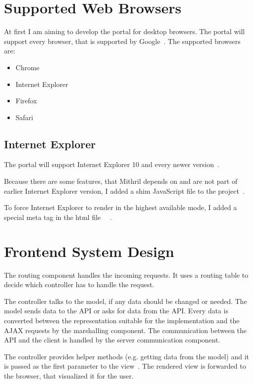 \section{Supported Web Browsers}
At first I am aiming to develop the portal for desktop browsers. The portal will support every browser, that is supported by Google~\cite{google-support}.
The supported browsers are:
\begin{itemize}
	\item Chrome
	\item Internet Explorer
	\item Firefox
	\item Safari
\end{itemize}

\subsection{Internet Explorer}
The portal will support Internet Explorer 10 and every newer version~\cite{google-support-blog}.

Because there are some features, that Mithril depends on and are not part of earlier Internet Explorer version, I added a shim JavaScript file to the project~\cite{Mithril-tools}. 

To force Internet Explorer to render in the highest available mode, I added a special meta tag in the html file~\cite{IE10-microsoft}~\cite{IE10-html5-boiler} .

\section{Frontend System Design}
\label{frontend-system-design}
%

The routing component handles the incoming requests. It uses a routing table to decide which controller has to handle the request.

The controller talks to the model, if any data should be changed or needed. The model sends data to the API or asks for data from the API. Every data is converted between the representation suitable for the implementation and the AJAX requests by the marshalling component. The communication between the API and the client is handled by the server communication component.

The controller provides helper methods (e.g. getting data from the model) and it is passed as the first parameter to the view~\cite{Mithril-routing}. The rendered view is forwarded to the browser, that visualized it for the user.

